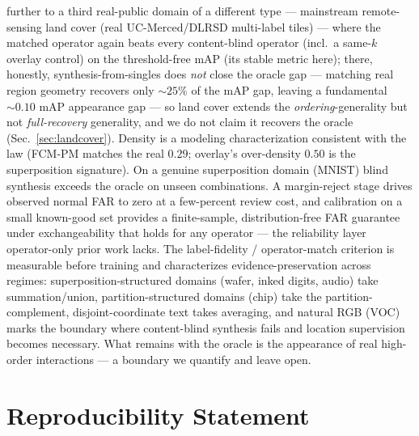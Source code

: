 \documentclass[11pt]{article}
\begin{document}
further to a third real-public domain of a different type --- mainstream remote-sensing land
cover (real UC-Merced/DLRSD multi-label tiles) --- where the matched operator again beats
every content-blind operator (incl.\ a same-$k$ overlay control) on the threshold-free mAP
(its stable metric here); there, honestly, synthesis-from-singles does \emph{not} close the
oracle gap --- matching real region geometry recovers only ${\sim}25\%$ of the mAP gap,
leaving a fundamental ${\sim}0.10$ mAP appearance gap --- so land cover extends the
\emph{ordering}-generality but not \emph{full-recovery} generality, and we do not claim it
recovers the oracle (Sec.~\ref{sec:landcover}). Density is a modeling characterization
consistent with the law (FCM-PM matches the real $0.29$; overlay's over-density $0.50$ is the
superposition signature).
On a genuine superposition domain (MNIST) blind synthesis exceeds the oracle on unseen
combinations. A margin-reject stage drives observed normal FAR to zero at a
few-percent review cost, and calibration on a small known-good set provides a
finite-sample, distribution-free FAR guarantee under exchangeability that holds for
any operator --- the reliability layer operator-only prior work lacks. The
label-fidelity / operator-match criterion is measurable before training and
characterizes evidence-preservation across regimes: superposition-structured domains
(wafer, inked digits, audio) take summation/union, partition-structured domains (chip)
take the partition-complement, disjoint-coordinate text takes averaging, and natural
RGB (VOC) marks the boundary where content-blind synthesis fails and location
supervision becomes necessary. What remains with the oracle is the appearance of real
high-order interactions --- a boundary we quantify and leave open.

\section*{Reproducibility Statement}
\end{document}
